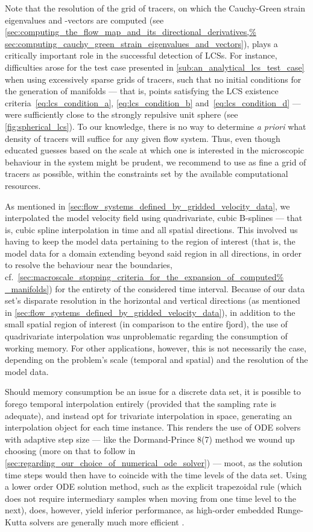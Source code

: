 Note that the resolution of the grid of tracers, on which the Cauchy-Green
strain eigenvalues and -vectors are computed (see
\cref{sec:computing_the_flow_map_and_its_directional_derivatives,%
sec:computing_cauchy_green_strain_eigenvalues_and_vectors}), plays a critically
important role in the successful detection of LCSs. For instance, difficulties
arose for the test case presented in \cref{sub:an_analytical_lcs_test_case}
when using excessively sparse grids of tracers, such that no initial
conditions for the generation of manifolds --- that is, points satisfying the
LCS existence criteria~\eqref{eq:lcs_condition_a}, \eqref{eq:lcs_condition_b}
and~\eqref{eq:lcs_condition_d} --- were sufficiently close to the strongly
repulsive unit sphere (see \cref{fig:spherical_lcs}). To our knowledge,
there is no way to determine \emph{a priori} what density of tracers will
suffice for any given flow system. Thus, even though educated guesses based on
the scale at which one is interested in the microscopic behaviour in the system
might be prudent, we recommend to use as fine a grid of tracers as possible,
within the constraints set by the available computational resources.

As mentioned in \cref{sec:flow_systems_defined_by_gridded_velocity_data}, we
interpolated the model velocity field using quadrivariate, cubic B-splines ---
that is, cubic spline interpolation in time and all spatial directions. This
involved us having to keep the model data pertaining to the region of interest
(that is, the model data for a domain extending beyond said region in all
directions, in order to resolve the behaviour near the boundaries, cf.\
\cref{sec:macroscale_stopping_criteria_for_the_expansion_of_computed%
_manifolds}) for the entirety of the considered time interval. Because of our
data set's disparate resolution in the horizontal and vertical directions
(as mentioned in \cref{sec:flow_systems_defined_by_gridded_velocity_data}), in
addition to the small spatial region of interest (in comparison to the entire
fjord), the use of quadrivariate interpolation was unproblematic regarding
the consumption of working memory. For other applications, however, this is not
necessarily the case, depending on the problem's scale (temporal and spatial)
and the resolution of the model data.

Should memory consumption be an issue for a discrete data set, it is possible
to forego temporal interpolation entirely (provided that the sampling rate
is adequate), and instead opt for trivariate interpolation in space, generating
an interpolation object for each time instance. This renders the use of
ODE solvers with adaptive step size --- like the Dormand-Prince 8(7) method we
wound up choosing (more on that to follow in
\cref{sec:regarding_our_choice_of_numerical_ode_solver}) --- moot, as the
solution time steps would then have to coincide with the time levels of the
data set. Using a lower order ODE solution method, such as the explicit
trapezoidal rule (which does not require intermediary samples when moving from
one time level to the next), does, however, yield inferior performance, as
high-order embedded Runge-Kutta solvers are generally much more efficient
\parencite{loken2017sensitivity}.



